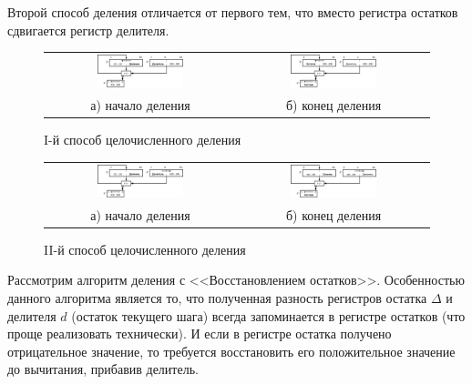 Второй способ деления отличается от первого тем, что вместо регистра остатков сдвигается регистр делителя.

\begin{figure}[!ht]
    \centering
    \begin{tabular}{c||c}
        \includegraphics[width=0.47\textwidth]{fig/IDivBegin}
            & \includegraphics[width=0.47\textwidth]{fig/IDivEnd} \\
        а) начало деления
            & б) конец деления
    \end{tabular}
    \caption{I-й способ целочисленного деления} \label{t:div:int:Isp}
\end{figure}

\begin{figure}[!ht]
    \centering
    \begin{tabular}{c||c}
        \includegraphics[width=0.47\textwidth]{fig/IIDivBegin}
            & \includegraphics[width=0.47\textwidth]{fig/IIDivEnd} \\
        а) начало деления
            & б) конец деления
    \end{tabular}
    \caption{II-й способ целочисленного деления} \label{t:div:int:IIsp}
\end{figure}

Рассмотрим алгоритм деления с <<Восстановлением остатков>>. Особенностью данного алгоритма является то, что полученная разность регистров остатка $\Delta$ и делителя $d$ (остаток текущего шага) всегда запоминается в регистре остатков (что проще реализовать технически). И если в регистре остатка получено отрицательное значение, то требуется восстановить его положительное значение до вычитания, прибавив делитель.

